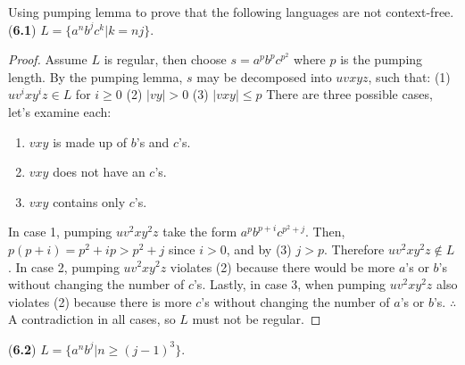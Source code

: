 \documentclass[11pt]{article}
\begin{document}
\noindent
Using pumping lemma to prove that the following languages are not
context-free.
\newline
\newline
\noindent
(\textbf{6.1}) $L=\{a^nb^jc^k|k=nj\}$.
\begin{proof}
Assume $L$ is regular, then choose $s = a^{p}b^{p}c^{p^{2}}$ where $p$ is the pumping length. By the pumping lemma, $s$ may be decomposed into $uvxyz$, such that:
\newline
\newline
(1) $uv^{i}xy^{i}z \in L$ for $i \geq 0$
\newline
(2) $|vy| > 0$
\newline
(3) $|vxy| \leq p$
\newline
\newline
There are three possible cases, let's examine each:
\begin{enumerate}
  \item $vxy$ is made up of $b$'s and $c$'s.
  \item $vxy$ does not have an $c$'s.
  \item $vxy$ contains only $c$'s.
\end{enumerate}
In case 1, pumping $uv^{2}xy^{2}z$ take the form $a^{p}b^{p+i}c^{p^{2}+j}$. Then, $p(p+i) = p^{2} + ip > p^{2} +j$ since $i > 0$, and by (3) $j > p$. Therefore $uv^{2}xy^{2}z \notin L$.
\newline
\newline
In case 2, pumping $uv^{2}xy^{2}z$ violates (2) because there would be more $a$'s or $b$'s without changing the number of $c$'s.
\newline
\newline
Lastly, in case 3, when pumping $uv^{2}xy^{2}z$ also violates (2) because there is more $c$'s without changing the number of $a$'s or $b$'s.
\newline
\newline
$\therefore$ A contradiction in all cases, so $L$ must not be regular.
\end{proof}
\newpage
\noindent
(\textbf{6.2}) $L=\{a^nb^j|n\geq (j-1)^3\}$.
\end{document}
